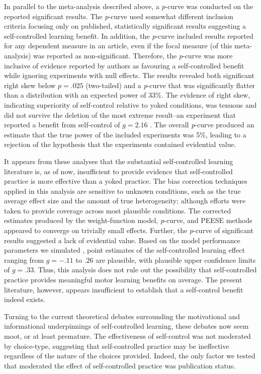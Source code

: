 \documentclass[man,floatsintext,hidelinks]{apa7}
\begin{document}
In parallel to the meta-analysis described above, a \emph{p}-curve was conducted on the reported significant results. The \emph{p}-curve used somewhat different inclusion criteria focusing only on published, statistically significant results suggesting a self-controlled learning benefit. In addition, the \emph{p}-curve included results reported for any dependent measure in an article, even if the focal measure (of this meta-analysis) was reported as non-significant. Therefore, the \emph{p}-curve was more inclusive of evidence reported by authors as favouring a self-controlled benefit while ignoring experiments with null effects. The results revealed both significant right skew below $p = .025$ (two-tailed) and a \emph{p}-curve that was significantly flatter than a distribution with an expected power of 33\%. The evidence of right skew, indicating superiority of self-control relative to yoked conditions, was tenuous and did not survive the deletion of the most extreme result--an experiment that reported a benefit from self-control of $g =  2.16$ \parencite{Wulf2014-ti}. The overall \emph{p}-curve produced an estimate that the true power of the included experiments was 5\%, leading to a rejection of the hypothesis that the experiments contained evidential value.

It appears from these analyses that the substantial self-controlled learning literature is, as of now, insufficient to provide evidence that self-controlled practice is more effective than a yoked practice. The bias correction techniques applied in this analysis are sensitive to unknown conditions, such as the true average effect size and the amount of true heterogeneity; although efforts were taken to provide coverage across most plausible conditions. The corrected estimates produced by the weight-function model, \emph{p}-curve, and PEESE methods appeared to converge on trivially small effects. Further, the \emph{p}-curve of significant results suggested a lack of evidential value. Based on the model performance parameters we simulated \parencite{Carter2019-vv}, point estimates of the self-controlled learning effect ranging from $g = -.11$ to $.26$ are plausible, with plausible upper confidence limits of $g = .33$. Thus, this analysis does not rule out the possibility that self-controlled practice provides meaningful motor learning benefits on average. The present literature, however, appears insufficient to establish that a self-control benefit indeed exists.

Turning to the current theoretical debates surrounding the motivational and informational underpinnings of self-controlled learning, these debates now seem moot, or at least premature. The effectiveness of self-control was not moderated by choice-type, suggesting that self-controlled practice may be ineffective regardless of the nature of the choices provided. Indeed, the only factor we tested that moderated the effect of self-controlled practice was publication status.
\end{document}
